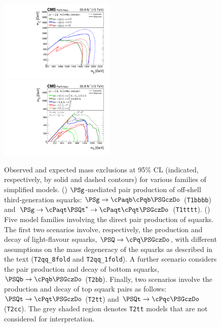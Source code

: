 \begin{figure}[!t]
  \centering
  \includegraphics[width=0.49\textwidth]{Figures/gluinoSUMMARY.pdf}~
  \includegraphics[width=0.49\textwidth]{Figures/squarkSUMMARY.pdf}\\
  \caption{Observed and expected mass exclusions at 95\% CL
    (indicated, respectively, by solid and dashed contours) for
    various families of simplified models. (\cmsLeft) $\PSg$-mediated
    pair production of off-shell third-generation squarks: $\PSg\to
    \cPaqb\cPqb\PSGczDo$ (\texttt{T1bbbb}) and $\PSg\to
    \cPaqt\PSQt^*\to \cPaqt\cPqt\PSGczDo$ (\texttt{T1tttt}).
    (\cmsRight) Five model families involving the direct pair
    production of squarks. The first two scenarios involve,
    respectively, the production and decay of light-flavour squarks,
    $\PSQ\to \cPq\PSGczDo$, with different assumptions on the mass
    degeneracy of the squarks as described in the text
    (\texttt{T2qq\_8fold} and \texttt{T2qq\_1fold}). A further
    scenario considers the pair production and decay of bottom
    squarks, $\PSQb\to \cPqb\PSGczDo$ (\texttt{T2bb}). Finally, two
    scenarios involve the production and decay of top squark pairs as
    follows: $\PSQt\to \cPqt\PSGczDo$ (\texttt{T2tt}) and $\PSQt\to
    \cPqc\PSGczDo$ (\texttt{T2cc}). The grey shaded region denotes
    \texttt{T2tt} models that are not considered for interpretation.
  }
  \label{fig:limits} 
\end{figure}

